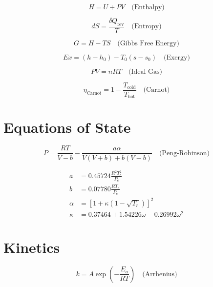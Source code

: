 \documentclass[12pt,twoside,openany]{book}
\begin{document}
\begin{dmath}
\boxed{H = U + PV} \quad \text{(Enthalpy)}
\end{dmath}

\begin{dmath}
\boxed{dS = \frac{\delta Q_{\text{rev}}}{T}} \quad \text{(Entropy)}
\end{dmath}

\begin{dmath}
\boxed{G = H - TS} \quad \text{(Gibbs Free Energy)}
\end{dmath}

\begin{dmath}
\boxed{Ex = (h - h_0) - T_0(s - s_0)} \quad \text{(Exergy)}
\end{dmath}

\begin{dmath}
\boxed{PV = nRT} \quad \text{(Ideal Gas)}
\end{dmath}

\begin{dmath}
\boxed{\eta_{\text{Carnot}} = 1 - \frac{T_{\text{cold}}}{T_{\text{hot}}}} \quad \text{(Carnot)}
\end{dmath}

\section{Equations of State}

\begin{dmath}
\boxed{P = \frac{RT}{V - b} - \frac{a\alpha}{V(V + b) + b(V - b)}} \quad \text{(Peng-Robinson)}
\end{dmath}

\begin{align}
a      &= 0.45724 \frac{R^2 T_c^2}{P_c} \\
b      &= 0.07780 \frac{RT_c}{P_c} \\
\alpha &= \left[1 + \kappa\left(1 - \sqrt{T_r}\right)\right]^2 \\
\kappa &= 0.37464 + 1.54226\omega - 0.26992\omega^2
\end{align}

\section{Kinetics}

\begin{dmath}
\boxed{k = A \exp\!\left(-\frac{E_a}{RT}\right)} \quad \text{(Arrhenius)}
\end{dmath}
\end{document}
